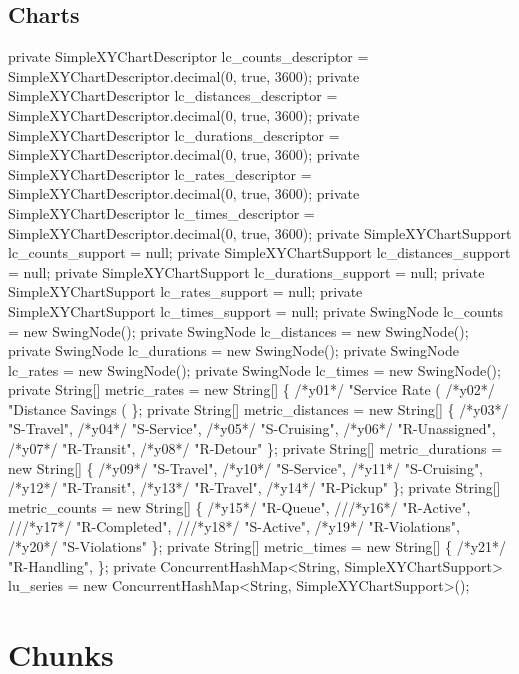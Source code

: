 \subsection{Charts}
\nwenddocs{}\plusendmoddef
private SimpleXYChartDescriptor lc_counts_descriptor = SimpleXYChartDescriptor.decimal(0, true, 3600);
private SimpleXYChartDescriptor lc_distances_descriptor = SimpleXYChartDescriptor.decimal(0, true, 3600);
private SimpleXYChartDescriptor lc_durations_descriptor = SimpleXYChartDescriptor.decimal(0, true, 3600);
private SimpleXYChartDescriptor lc_rates_descriptor = SimpleXYChartDescriptor.decimal(0, true, 3600);
private SimpleXYChartDescriptor lc_times_descriptor = SimpleXYChartDescriptor.decimal(0, true, 3600);
private SimpleXYChartSupport lc_counts_support = null;
private SimpleXYChartSupport lc_distances_support = null;
private SimpleXYChartSupport lc_durations_support = null;
private SimpleXYChartSupport lc_rates_support = null;
private SimpleXYChartSupport lc_times_support = null;
private SwingNode lc_counts = new SwingNode();
private SwingNode lc_distances = new SwingNode();
private SwingNode lc_durations = new SwingNode();
private SwingNode lc_rates = new SwingNode();
private SwingNode lc_times = new SwingNode();
private String[] metric_rates = new String[] \{
/*y01*/      "Service Rate (%
/*y02*/      "Distance Savings (%
    \};
private String[] metric_distances = new String[] \{
/*y03*/      "S-Travel",
/*y04*/      "S-Service",
/*y05*/      "S-Cruising",
/*y06*/      "R-Unassigned",
/*y07*/      "R-Transit",
/*y08*/      "R-Detour"
    \};
private String[] metric_durations = new String[] \{
/*y09*/      "S-Travel",
/*y10*/      "S-Service",
/*y11*/      "S-Cruising",
/*y12*/      "R-Transit",
/*y13*/      "R-Travel",
/*y14*/      "R-Pickup"
    \};
private String[] metric_counts = new String[] \{
/*y15*/      "R-Queue",
///*y16*/      "R-Active",
///*y17*/      "R-Completed",
///*y18*/      "S-Active",
/*y19*/      "R-Violations",
/*y20*/      "S-Violations"
    \};
private String[] metric_times = new String[] \{
/*y21*/      "R-Handling",
    \};
private ConcurrentHashMap<String, SimpleXYChartSupport> lu_series
  = new ConcurrentHashMap<String, SimpleXYChartSupport>();
\nwendcode{}\nwdocspar

\section{Chunks}

